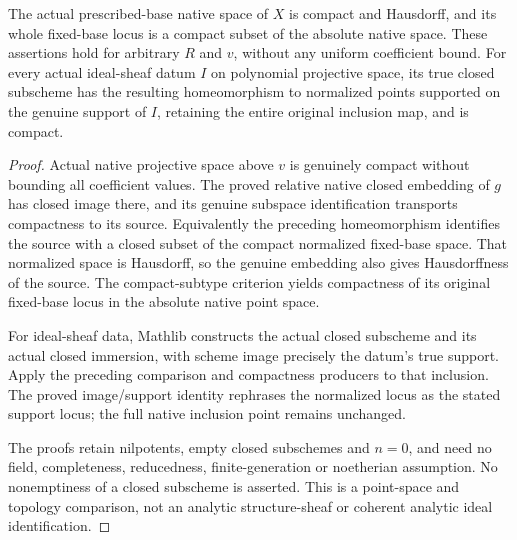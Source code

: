 \begin{theorem}
\label{projective:native-closed-projective-compactness}
\leanok
{}
The actual prescribed-base native space of $X$ is compact and Hausdorff,
and its whole fixed-base locus is a compact subset of the absolute native
space. These assertions hold for arbitrary $R$ and $v$, without any
uniform coefficient bound. For every actual ideal-sheaf datum $I$ on
polynomial projective space, its true closed subscheme has the resulting
homeomorphism to normalized points supported on the genuine support of
$I$, retaining the entire original inclusion map, and is compact.
\end{theorem}
\begin{proof}
Actual native projective space above $v$ is genuinely compact without
bounding all coefficient values. The proved relative native closed
embedding of $g$ has closed image there, and its genuine subspace
identification transports compactness to its source. Equivalently the
preceding homeomorphism identifies the source with a closed subset of
the compact normalized fixed-base space. That normalized space is
Hausdorff, so the genuine embedding also gives Hausdorffness of the
source. The compact-subtype criterion yields compactness of its original
fixed-base locus in the absolute native point space.

For ideal-sheaf data, Mathlib constructs the actual closed subscheme and
its actual closed immersion, with scheme image precisely the datum's
true support. Apply the preceding comparison and compactness producers
to that inclusion. The proved image/support identity rephrases the
normalized locus as the stated support locus; the full native inclusion
point remains unchanged.

The proofs retain nilpotents, empty closed subschemes and $n=0$, and need
no field, completeness, reducedness, finite-generation or noetherian
assumption. No nonemptiness of a closed subscheme is asserted. This is a
point-space and topology comparison, not an analytic structure-sheaf or
coherent analytic ideal identification.
\end{proof}
